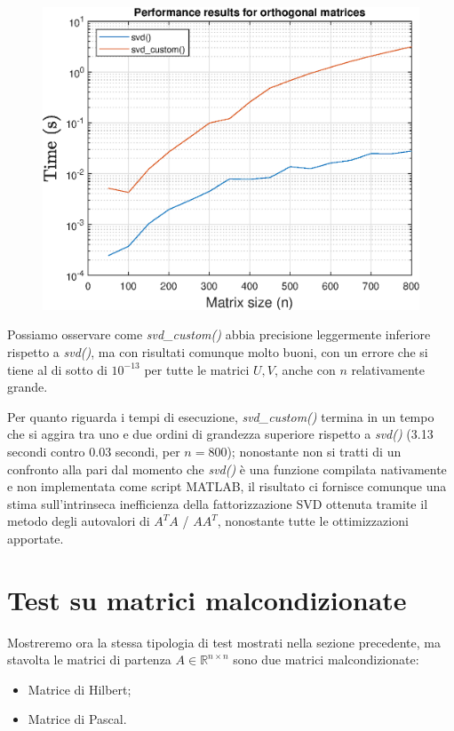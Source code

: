 \begin{figure}[!htb]
\includegraphics[width=\linewidth]{imgs/03_-_Performance_results_for_orthogonal_matrices.eps}
\endminipage
\end{figure}

Possiamo osservare come \textit{svd\_custom()} abbia precisione leggermente 
inferiore rispetto a \textit{svd()}, ma con risultati comunque molto buoni, con 
un errore che si tiene al di sotto di $10^{-13}$ per tutte le matrici $U,V$, 
anche con $n$ relativamente grande.

Per quanto riguarda i tempi di esecuzione, \textit{svd\_custom()} termina in un 
tempo che si aggira tra uno e due ordini di grandezza superiore rispetto a 
\textit{svd()} (3.13 secondi contro 0.03 secondi, per $n = 800$); nonostante non 
si tratti di un confronto alla pari dal momento che \textit{svd()} è una 
funzione compilata nativamente e non implementata come script MATLAB, il 
risultato ci fornisce comunque una stima sull'intrinseca inefficienza della 
fattorizzazione SVD ottenuta tramite il metodo degli autovalori di
$A^T A$ / $A A^T$, nonostante tutte le ottimizzazioni apportate.


\newpage
\section{Test su matrici malcondizionate}
Mostreremo ora la stessa tipologia di test mostrati nella sezione precedente, ma 
stavolta le matrici di partenza $A \in \mathbb{R}^{n \times n}$ sono due matrici 
malcondizionate:
\begin{itemize}
	\item Matrice di Hilbert;
	\item Matrice di Pascal.
\end{itemize}

